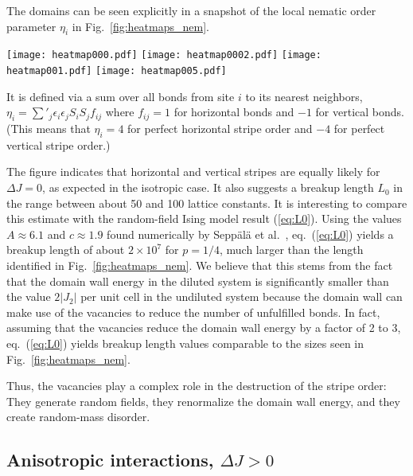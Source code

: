 \documentclass[twocolumn,showpacs,superscriptaddress,aps,prb]{revtex4-2}
\begin{document}
The domains can be seen explicitly in a snapshot of the local nematic order parameter $\eta_i$
in Fig.\ \ref{fig:heatmaps_nem}.
\begin{figure*}
\texttt{[image: heatmap000.pdf]}
\texttt{[image: heatmap0002.pdf]}
\texttt{[image: heatmap001.pdf]}
\texttt{[image: heatmap005.pdf]}
\caption{Snapshots of the local nematic order parameter $\eta_i$ of one particular disorder configuration
for several anisotropies: $\Delta J = 0$, 0.002, 0.01, 0.05 (left to right).
The data are taken a temperature $T=0.1$ reached via
simulated annealing from high temperatures. $L=192$, $p=1/4$, $J_1=-J_2=1$. }
\label{fig:heatmaps_nem}
\end{figure*}
It is defined via a sum over all bonds from site $i$ to its nearest neighbors,
$\eta_i = \sum'_{j} \epsilon_i \epsilon_j S_i S_j f_{ij}$ where $f_{ij}=1$ for horizontal bonds
and $-1$ for vertical bonds. (This means that $\eta_i=4$ for perfect horizontal stripe order
and $-4$ for perfect vertical stripe order.)


The figure indicates that horizontal and vertical stripes are equally likely for  $\Delta J =0$, as expected in
the isotropic case. It also suggests a breakup length $L_0$ in the range between
about 50 and 100 lattice constants.
It is interesting to compare this estimate with the random-field Ising model result (\ref{eq:L0}).
Using the values $A \approx 6.1$ and $c \approx 1.9$ found numerically by Sepp\"al\"a et al.\
\cite{SeppalaPetejaAlava98,*SeppalaAlava01}, eq.\ (\ref{eq:L0}) yields a breakup length of
about $2 \times 10^7$ for $p=1/4$, much larger than the length identified in Fig.\ \ref{fig:heatmaps_nem}.
%
We believe that this stems from the fact that the domain wall energy in the diluted system
is significantly smaller than the value $2 |J_2|$ per unit cell in the undiluted system because
the domain wall can make use of the vacancies to reduce the number of unfulfilled bonds. In fact, assuming
that the vacancies reduce the domain wall energy by a factor of 2 to 3,  eq.\ (\ref{eq:L0}) yields
breakup length values comparable to the sizes seen in Fig.\ \ref{fig:heatmaps_nem}.

Thus, the vacancies play a complex role in the destruction  of the stripe order: They generate random
fields, they renormalize the domain wall energy, and they create random-mass disorder.

\subsection{Anisotropic interactions, $\Delta J >0$}
\label{subsec:res_anisotropic}
\end{document}
